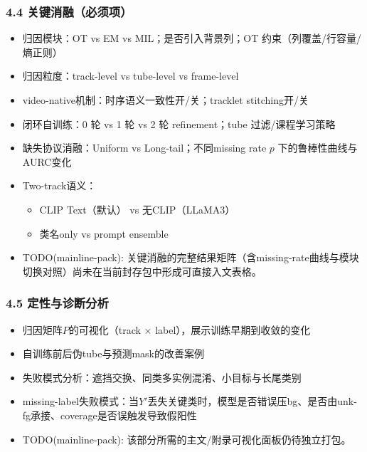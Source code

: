\documentclass[UTF8]{ctexart}
\begin{document}
\subsubsection*{4.4 关键消融（必须项）}
\begin{itemize}
\item 归因模块：OT vs EM vs MIL；是否引入背景列；OT 约束（列覆盖/行容量/熵正则）
\item 归因粒度：track-level vs tube-level vs frame-level
\item video-native机制：时序语义一致性开/关；tracklet stitching开/关
\item 闭环自训练：0 轮 vs 1 轮 vs 2 轮 refinement；tube 过滤/课程学习策略
\item 缺失协议消融：Uniform vs Long-tail；不同missing rate $p$ 下的鲁棒性曲线与AURC变化
\item Two-track语义：
\begin{itemize}
\begin{itemize}
\item CLIP Text（默认） vs 无CLIP（LLaMA3）
\item 类名only vs prompt ensemble
\end{itemize}
\end{itemize}
\item TODO(mainline-pack): 关键消融的完整结果矩阵（含missing-rate曲线与模块切换对照）尚未在当前封存包中形成可直接入文表格。
\end{itemize}

\subsubsection*{4.5 定性与诊断分析}
\begin{itemize}
\item 归因矩阵$P$的可视化（track × label），展示训练早期到收敛的变化
\item 自训练前后伪tube与预测mask的改善案例
\item 失败模式分析：遮挡交换、同类多实例混淆、小目标与长尾类别
\item missing-label失败模式：当$Y'$丢失关键类时，模型是否错误压bg、是否由unk-fg承接、coverage是否误触发导致假阳性
\item TODO(mainline-pack): 该部分所需的主文/附录可视化面板仍待独立打包。
\end{itemize}

\par\noindent\hrulefill\par
\end{document}
